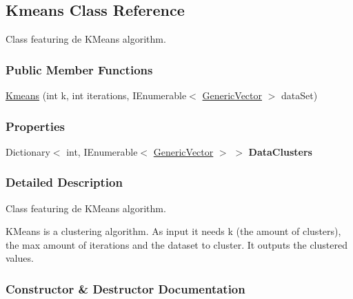 \hypertarget{classDataTools_1_1clustering_1_1Kmeans}{}\subsection{Kmeans Class Reference}
\label{classDataTools_1_1clustering_1_1Kmeans}


Class featuring de K\+Means algorithm.  


\subsubsection*{Public Member Functions}
\begin{DoxyCompactItemize}
\item 
\hyperlink{classDataTools_1_1clustering_1_1Kmeans_a0104b68b82ac185d65d0df9a02569ec8_a0104b68b82ac185d65d0df9a02569ec8}{Kmeans} (int k, int iterations, I\+Enumerable$<$ \hyperlink{classDataTools_1_1GenericVector}{Generic\+Vector} $>$ data\+Set)
\end{DoxyCompactItemize}
\subsubsection*{Properties}
\begin{DoxyCompactItemize}
\item 
\mbox{\label{classDataTools_1_1clustering_1_1Kmeans_a06317119faad60c7efd9feabeb13c795}} 
Dictionary$<$ int, I\+Enumerable$<$ \hyperlink{classDataTools_1_1GenericVector}{Generic\+Vector} $>$ $>$ {\bfseries Data\+Clusters}
\end{DoxyCompactItemize}


\subsubsection{Detailed Description}
Class featuring de K\+Means algorithm. 

K\+Means is a clustering algorithm. As input it needs {\ttfamily k} (the amount of clusters), the max amount of iterations and the dataset to cluster. It outputs the clustered values. 

\subsubsection{Constructor \& Destructor Documentation}
\mbox{\label{classDataTools_1_1clustering_1_1Kmeans_a0104b68b82ac185d65d0df9a02569ec8_a0104b68b82ac185d65d0df9a02569ec8}} 
